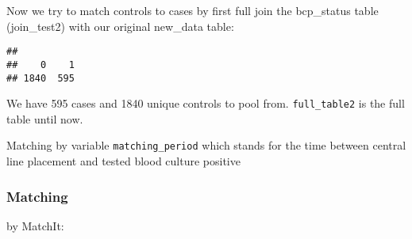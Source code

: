 \documentclass[
]{article}
\newenvironment{Shaded}{\begin{snugshade}}{\end{snugshade}}
\newcommand{\AttributeTok}[1]{\textcolor[rgb]{0.77,0.63,0.00}{#1}}
\newcommand{\DecValTok}[1]{\textcolor[rgb]{0.00,0.00,0.81}{#1}}
\newcommand{\FunctionTok}[1]{\textcolor[rgb]{0.00,0.00,0.00}{#1}}
\newcommand{\NormalTok}[1]{#1}
\newcommand{\OtherTok}[1]{\textcolor[rgb]{0.56,0.35,0.01}{#1}}
\newcommand{\SpecialCharTok}[1]{\textcolor[rgb]{0.00,0.00,0.00}{#1}}
\newcommand{\StringTok}[1]{\textcolor[rgb]{0.31,0.60,0.02}{#1}}
\begin{document}
Now we try to match controls to cases by first full join the bcp\_status
table (join\_test2) with our original new\_data table:

\begin{Shaded}
\end{Shaded}

\begin{verbatim}
## 
##    0    1 
## 1840  595
\end{verbatim}

We have 595 cases and 1840 unique controls to pool from.
\texttt{full\_table2} is the full table until now.

Matching by variable \texttt{matching\_period} which stands for the time
between central line placement and tested blood culture positive

\hypertarget{matching}{%
\subsubsection{Matching}\label{matching}}

by MatchIt:
\end{document}
